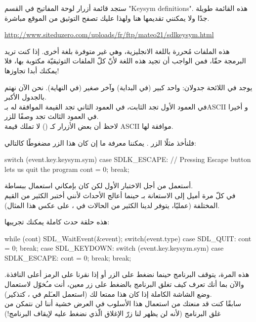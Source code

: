 ستجد قائمة أزرار لوحة المفاتيح في القسم
"\textenglish{Keysym definitions}".
هذه القائمة طويلة جدًا ولا يمكنني تقديمها هنا ولهذا عليك تصفح التوثيق من الموقع مباشرة.

\url{http://www.siteduzero.com/uploads/fr/ftp/mateo21/sdlkeysym.html}

هذه الملفات مُحررة باللغة الانجليزية، وهي غير متوفرة بلغة أخرى. إذا كنت تريد البرمجة حقّا، فمن الواجب أن تجيد هذه اللغة لأنّ  كلّ الملفات التوثيقيّة مكتوبة بها، فلا يمكنك أبدا تجاوزها!

يوجد في اللائحة جدولان: واحد كبير (في البداية) وآخر صغير (في النهاية). نحن الآن نهتم بالجدول الأكبر.\\
في العمود الأول تجد الثابت، في العمود الثاني تجد القيمة الموافقة له بـ\textenglish{ASCII}
و أخيرا في العمود الثالث تجد وصفًا للزر.\\
لاحظ أن بعض الأزرار كـ
()
لا تملك قيمة
\textenglish{ASCII}
موافقة لها.

فلنأخذ مثلًا الزر
.
يمكننا معرفة ما إن كان هذا الزر مضغوطًا كالتالي:

\begin{Csource}
switch (event.key.keysym.sym)
{
	case SDLK_ESCAPE: // Pressing Escape button lets us quit the program
	cont = 0;
	break;
}
\end{Csource}

\begin{information}
أستعمل
من أجل الاختبار الأول لكن كان بإمكاني استعمال
ببساطة.\\
في كلّ مرة أميل إلى الاستعانة بـ
حينما أعالج الأحداث لأنني أختبر الكثير من القيم المختلفة (عمليًا، يتوفر لدينا الكثير من الحالات في ،
على عكس هذا المثال).
\end{information}

هذه حلقة حدث كاملة يمكنك تجريبها:

\begin{Csource}
while (cont)
{
	SDL_WaitEvent(&event);
	switch(event.type)
	{
		case SDL_QUIT:
		cont = 0;
		break;
		case SDL_KEYDOWN:
		switch (event.key.keysym.sym)
		{
			case SDLK_ESCAPE: 
			cont = 0;
			break;
		}
		break;
	}
}
\end{Csource}

\begin{information}
هذه المرة، يتوقف البرنامج حينما نضغط على الزر
أو إذا نقرنا على الرمز
أعلى النافذة. والآن بما أنك تعرف كيف تغلق البرنامج بالضغط على زر معين، أنت مـُخوّل لاستعمال وضع الشاشة الكاملة إذا كان هذا ممتعا لك (استعمل العـَلم
في ،
كتذكير).\\
سابقًا كنت قد منعتك من استعمال هذا الأسلوب في العرض خشية أننا لن نتمكن من غلق البرنامج (لأنه لن يظهر لنا زرّ الإغلاق الّذي نضغط عليه لإيقاف البرنامج!)
\end{information}

